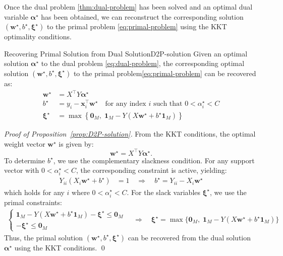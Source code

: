 Once the dual problem \eqref{thm:dual-problem} has been solved and an optimal dual variable
$\symbf{\alpha}^\star$ has been obtained, we can reconstruct the corresponding solution
$(\symbf{w}^\star, b^\star, \symbf{\xi}^\star)$ to the primal problem \eqref{eq:primal-problem}
using the KKT optimality conditions.
\begin{proposition}{Recovering Primal Solution from Dual Solution}{D2P-solution}
	Given an optimal solution $\symbf{\alpha}^\star$ to the dual problem \eqref{eq:dual-problem}, the corresponding optimal solution  $(\symbf{w}^\star, b^\star, \symbf{\xi}^\star)$ to the primal problem\eqref{eq:primal-problem} can be recovered as:
	\begin{align*}
		\symbf{w}^\star   & = X^\top Y \symbf{\alpha}^\star                                                                                 \\
		b^\star           & = y_i - \symbf{x}_i^\top\symbf{w}^\star \quad \text{for any index } i \text{ such that } 0 < \alpha_i^\star < C \\
		\symbf{\xi}^\star & = \max\left\{\symbf{0}_M,\; \symbf{1}_M - Y(X\symbf{w}^\star + b^\star\symbf{1}_M)\right\}
	\end{align*}
\end{proposition}
\begin{proof}[Proof of Proposition~\ref{prop:D2P-solution}]{}{}
	From the KKT conditions, the optimal weight vector $\symbf{w}^\star$ is given by:
	\[
	\symbf{w}^\star = X^\top Y \symbf{\alpha}^\star.
	\]
	To determine $b^\star$, we use the complementary slackness condition. For any support vector with $0 < \alpha_i^\star < C$, the corresponding constraint is active, yielding:
	\begin{align*}
	Y_{ii}(X_i\symbf{w}^\star + b^\star) &= 1 \quad \Rightarrow \quad b^\star = Y_{ii} - X_i\symbf{w}^\star
	\end{align*}
	which holds for any $i$ where $0 < \alpha_i^\star < C$. 
	\medskip
	For the slack variables $\symbf{\xi}^\star$, we use the primal constraints:
	\begin{align*}
	\begin{cases}
	\symbf{1}_M - Y(X\symbf{w}^\star + b^\star\symbf{1}_M) - \symbf{\xi}^\star \leq \symbf{0}_M \\
	-\symbf{\xi}^\star \leq \symbf{0}_M
	\end{cases}
	\quad \Rightarrow \quad \symbf{\xi}^\star = \max\{\symbf{0}_M,\; \symbf{1}_M - Y(X\symbf{w}^\star + b^\star\symbf{1}_M)\}
	\end{align*}
	Thus, the primal solution $(\symbf{w}^\star, b^\star, \symbf{\xi}^\star)$ can be recovered from the dual solution $\symbf{\alpha}^\star$ using the KKT conditions. \qed
\end{proof}
\medskip
